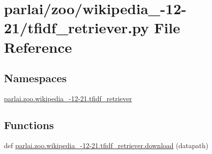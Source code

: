 \hypertarget{zoo_2wikipedia__2016-12-21_2tfidf__retriever_8py}{}\section{parlai/zoo/wikipedia\+\_-\/12-\/21/tfidf\+\_\+retriever.py File Reference}
\label{zoo_2wikipedia__2016-12-21_2tfidf__retriever_8py}
\subsection*{Namespaces}
\begin{DoxyCompactItemize}
\item 
 \hyperlink{namespaceparlai_1_1zoo_1_1wikipedia__2016-12-21_1_1tfidf__retriever}{parlai.\+zoo.\+wikipedia\+\_-\/12-\/21.\+tfidf\+\_\+retriever}
\end{DoxyCompactItemize}
\subsection*{Functions}
\begin{DoxyCompactItemize}
\item 
def \hyperlink{namespaceparlai_1_1zoo_1_1wikipedia__2016-12-21_1_1tfidf__retriever_ab7d8c33868c4641072b81d1d66602748}{parlai.\+zoo.\+wikipedia\+\_-\/12-\/21.\+tfidf\+\_\+retriever.\+download} (datapath)
\end{DoxyCompactItemize}
